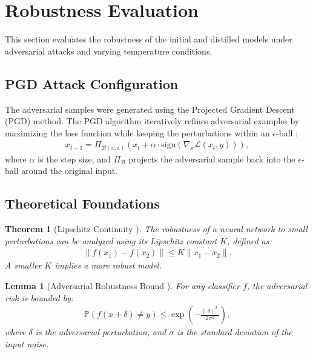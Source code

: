 \documentclass[a4paper, 11pt]{article}
\newtheorem{theorem}{Theorem}
\newtheorem{lemma}{Lemma}
\begin{document}
\section{Robustness Evaluation}

This section evaluates the robustness of the initial and distilled models under adversarial attacks and varying temperature conditions.

\subsection{PGD Attack Configuration}

The adversarial samples were generated using the Projected Gradient Descent (PGD) method. The PGD algorithm iteratively refines adversarial examples by maximizing the loss function while keeping the perturbations within an $\epsilon$-ball :
\begin{align*}
    x_{t+1} = \Pi_{\mathcal{B}(x, \epsilon)} \left( x_t + \alpha \cdot \text{sign}\left( \nabla_x \mathcal{L}(x_t, y) \right) \right),
\end{align*}
where $\alpha$ is the step size, and $\Pi_{\mathcal{B}}$ projects the adversarial sample back into the $\epsilon$-ball around the original input.

\subsection{Theoretical Foundations}

\begin{theorem}[Lipschitz Continuity \cite{szegedy2014intriguing}]
    The robustness of a neural network to small perturbations can be analyzed using its Lipschitz constant $K$, defined as:
    \begin{align*}
        \|f(x_1) - f(x_2)\| \leq K \|x_1 - x_2\|.
    \end{align*}
    A smaller $K$ implies a more robust model.
\end{theorem}

\begin{lemma}[Adversarial Robustness Bound \cite{goodfellow2015explaining}]
    For any classifier $f$, the adversarial risk is bounded by:
    \begin{align*}
        \mathbb{P}(f(x + \delta) \neq y) \leq \exp\left(-\frac{\|\delta\|^2}{2\sigma^2}\right),
    \end{align*}
    where $\delta$ is the adversarial perturbation, and $\sigma$ is the standard deviation of the input noise.
\end{lemma}
\end{document}

